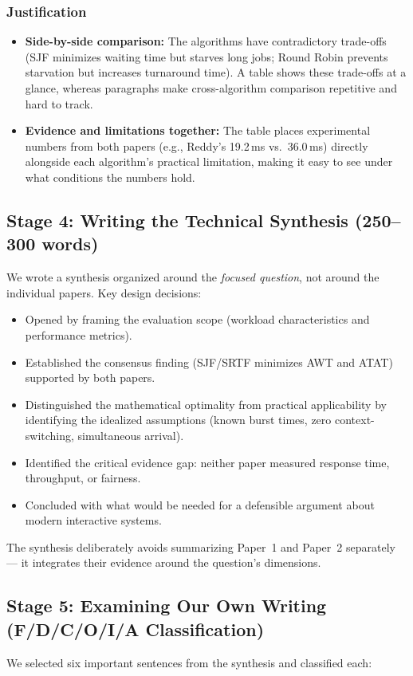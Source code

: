 \documentclass[11pt, a4paper]{article}
\begin{document}
\subsubsection*{Justification}
\begin{itemize}[nosep]
    \item \textbf{Side-by-side comparison:} The algorithms have contradictory trade-offs (SJF minimizes waiting time but starves long jobs; Round Robin prevents starvation but increases turnaround time). A table shows these trade-offs at a glance, whereas paragraphs make cross-algorithm comparison repetitive and hard to track.
    \item \textbf{Evidence and limitations together:} The table places experimental numbers from both papers (e.g., Reddy's 19.2\,ms vs.\ 36.0\,ms) directly alongside each algorithm's practical limitation, making it easy to see under what conditions the numbers hold.
\end{itemize}

\subsection{Stage 4: Writing the Technical Synthesis (250--300 words)}
We wrote a synthesis organized around the \emph{focused question}, not around the individual papers. Key design decisions:
\begin{itemize}[nosep]
    \item Opened by framing the evaluation scope (workload characteristics and performance metrics).
    \item Established the consensus finding (SJF/SRTF minimizes AWT and ATAT) supported by both papers.
    \item Distinguished the mathematical optimality from practical applicability by identifying the idealized assumptions (known burst times, zero context-switching, simultaneous arrival).
    \item Identified the critical evidence gap: neither paper measured response time, throughput, or fairness.
    \item Concluded with what would be needed for a defensible argument about modern interactive systems.
\end{itemize}
The synthesis deliberately avoids summarizing Paper~1 and Paper~2 separately --- it integrates their evidence around the question's dimensions.

\subsection{Stage 5: Examining Our Own Writing (F/D/C/O/I/A Classification)}
We selected six important sentences from the synthesis and classified each:
\end{document}
